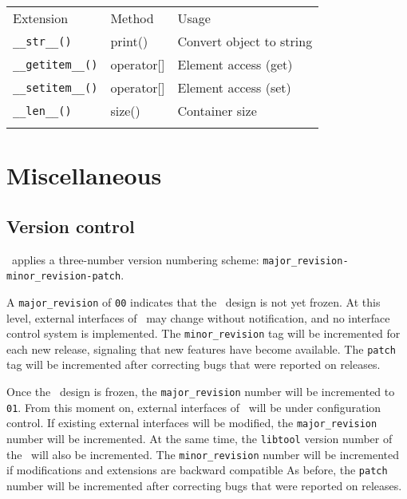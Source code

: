 \documentclass{article}[12pt,a4]
\begin{document}
\begin{center}
\begin{tabular}{lll}
\hline
\hline
\noalign{\smallskip}
Extension & Method & Usage \\
\noalign{\smallskip}
\hline
\noalign{\smallskip}
{\tt \_\_str\_\_()} & print() & Convert object to string \\
{\tt \_\_getitem\_\_()} & operator[] & Element access (get) \\
{\tt \_\_setitem\_\_()} & operator[] & Element access (set) \\
{\tt \_\_len\_\_()} & size() & Container size \\
\noalign{\smallskip}
\hline
\end{tabular}
\end{center}



\section{Miscellaneous}

\subsection{Version control}

\this\ applies a three-number version numbering scheme:
{\tt major\_revision-minor\_revision-patch}.

A {\tt major\_revision} of {\tt 00} indicates that the \this\ design is not yet frozen.
At this level, external interfaces of \this\ may change without notification, and no
interface control system is implemented.
The {\tt minor\_revision} tag will be incremented for each new release, signaling
that new features have become available.
The {\tt patch} tag will be incremented after correcting bugs that were reported
on releases.

Once the \this\ design is frozen, the {\tt major\_revision} number will be incremented 
to {\tt 01}.
From this moment on, external interfaces of \this\ will be under configuration control.
If existing external interfaces will be modified, the {\tt major\_revision} number will be
incremented.
At the same time, the {\tt libtool} version number of the \this\ will also be incremented.
The {\tt minor\_revision} number will be incremented if modifications and extensions
are backward compatible
As before, the {\tt patch} number will be incremented after correcting bugs that were 
reported on releases.
\end{document}
